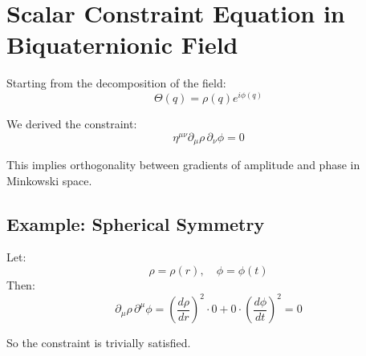 \documentclass{article}
\begin{document}
\section*{Scalar Constraint Equation in Biquaternionic Field}

Starting from the decomposition of the field:
\[
\Theta(q) = \rho(q) e^{i\phi(q)}
\]

We derived the constraint:
\[
\eta^{\mu\nu} \partial_\mu \rho \, \partial_\nu \phi = 0
\]

This implies orthogonality between gradients of amplitude and phase in Minkowski space.

\subsection*{Example: Spherical Symmetry}

Let:
\[
\rho = \rho(r), \quad \phi = \phi(t)
\]
Then:
\[
\partial_\mu \rho \, \partial^\mu \phi = \left(\frac{d\rho}{dr}\right)^2 \cdot 0 + 0 \cdot \left(\frac{d\phi}{dt}\right)^2 = 0
\]

So the constraint is trivially satisfied.
\end{document}
